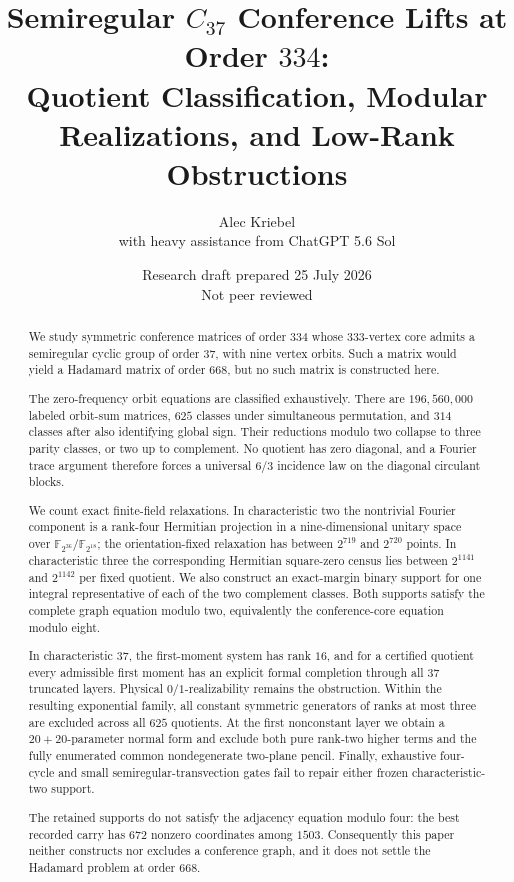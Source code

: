 \documentclass[11pt]{article}
\title{\textbf{Semiregular \(C_{37}\) Conference Lifts at Order \(334\):}\\
Quotient Classification, Modular Realizations, and Low-Rank Obstructions}
\author{Alec Kriebel\\[2pt]\large with heavy assistance from ChatGPT 5.6 Sol}
\date{Research draft prepared 25 July 2026\\Not peer reviewed}
\theoremstyle{definition}
\newcommand{\F}{\mathbb{F}}
\begin{document}
\maketitle

\begin{abstract}
We study symmetric conference matrices of order \(334\) whose
\(333\)-vertex core admits a semiregular cyclic group of order \(37\),
with nine vertex orbits.  Such a matrix would yield a Hadamard matrix of
order \(668\), but no such matrix is constructed here.

The zero-frequency orbit equations are classified exhaustively.  There
are \(196{,}560{,}000\) labeled orbit-sum matrices, \(625\) classes under
simultaneous permutation, and \(314\) classes after also identifying
global sign.  Their reductions modulo two collapse to three parity
classes, or two up to complement.  No quotient has zero diagonal, and a
Fourier trace argument therefore forces a universal \(6/3\) incidence
law on the diagonal circulant blocks.

We count exact finite-field relaxations.  In characteristic two the
nontrivial Fourier component is a rank-four Hermitian projection in a
nine-dimensional unitary space over \(\F_{2^{36}}/\F_{2^{18}}\); the
orientation-fixed relaxation has between \(2^{719}\) and \(2^{720}\)
points.  In characteristic three the corresponding Hermitian
square-zero census lies between \(2^{1141}\) and \(2^{1142}\) per fixed
quotient.  We also construct an exact-margin binary support for one
integral representative of each of the two complement classes.  Both
supports satisfy the complete graph equation modulo two, equivalently
the conference-core equation modulo eight.

In characteristic \(37\), the first-moment system has rank \(16\), and
for a certified quotient every admissible first moment has an explicit
formal completion through all \(37\) truncated layers.  Physical
\(0/1\)-realizability remains the obstruction.  Within the resulting
exponential family, all constant symmetric generators of ranks at most
three are excluded across all \(625\) quotients.  At the first
nonconstant layer we obtain a \(20+20\)-parameter normal form and exclude
both pure rank-two higher terms and the fully enumerated common nondegenerate
two-plane pencil.  Finally, exhaustive four-cycle and small
semiregular-transvection gates fail to repair either frozen
characteristic-two support.

The retained supports do not satisfy the adjacency equation modulo four:
the best recorded carry has \(672\) nonzero coordinates among \(1503\).
Consequently this paper neither constructs nor excludes a conference
graph, and it does not settle the Hadamard problem at order \(668\).
\end{abstract}
\end{document}
